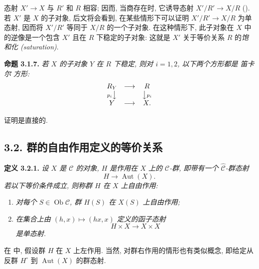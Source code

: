 态射 \(X'\to X\) 与 \(R'\) 和 \(R\) 相容; 因而, 当商存在时,
它诱导态射 \(X'/R'\to X/R\)
().
若 \(X'\) 是 \(X\) 的子对象, 后文将会看到,
在某些情形下可以证明 \(X'/R'\to X/R\) 为单态射,
因而将 \(X'/R'\) 等同于 \(X/R\) 的一个子对象.
在这种情形下, 此子对象在 \(X\) 中的逆像是一个包含 \(X'\)
且在 \(R\) 下稳定的子对象: 这就是 \(X'\) 关于等价关系
\(R\) 的\emph{饱和化 (saturation)}.

\medskip
\noindent{}\textbf{命题 3.1.7.}
\textit{若 \(X\) 的子对象 \(Y\) 在 \(R\) 下稳定,
则对 \(i=1,2\), 以下两个方形都是 笛卡尔 方形:}
\[
  \begin{array}{ccc}
    R_Y & \longrightarrow & R\\
    {\scriptstyle p_i}\big\downarrow && \big\downarrow{\scriptstyle p_i}\\
    Y & \longrightarrow & X.
  \end{array}
\]

证明是直接的.

\subsection*{3.2. 群的自由作用定义的等价关系}

\noindent{}\textbf{定义 3.2.1.}
\textit{设 \(X\) 是 \(\mathscr C\) 的对象, \(H\) 是作用在 \(X\) 上的
\(\mathscr C\)-群, 即带有一个 \(\widehat{\mathscr C}\)-群态射}
\[
  H\longrightarrow\operatorname{Aut}(X).
\]
\textit{若以下等价条件成立, 则称群 \(H\) 在 \(X\) 上\emph{自由}作用:}
\begin{enumerate}
  \item[(i)]
  \textit{对每个 \(S\in\operatorname{Ob}\mathscr C\),
  群 \(H(S)\) 在 \(X(S)\) 上自由作用;}
  \item[(ii)]
  \textit{在集合上由 \((h,x)\mapsto(hx,x)\) 定义的函子态射}
  \[
    H\times X\longrightarrow X\times X
  \]
  \textit{是单态射.}
\end{enumerate}

在  中,
假设群 \(H\) 在 \(X\) 上左作用. 当然, 对群右作用的情形也有类似概念,
即给定从反群 \(H^{\circ}\) 到 \(\operatorname{Aut}(X)\) 的群态射.

